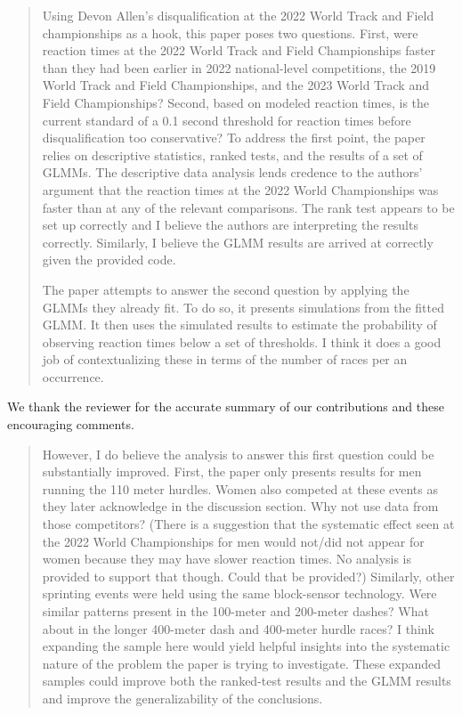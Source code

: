 \documentclass[12pt]{article}
\newenvironment{comment}%
{\begin{quotation}\noindent\small\it\color{darkblue}\ignorespaces%
}{\end{quotation}}
\begin{document}
\begin{comment}
Using Devon Allen's disqualification at the 2022 World Track and Field
championships as a hook, this paper poses two questions. First, were reaction
times at the 2022 World Track and Field Championships faster than they had been
earlier in 2022 national-level competitions, the 2019 World Track and Field
Championships, and the 2023 World Track and Field Championships? Second, based
on modeled reaction times, is the current standard of a 0.1 second threshold
for reaction times before disqualification too conservative? To
address the first point, the paper relies on descriptive statistics, ranked
tests, and the results of a set of GLMMs. The descriptive data analysis lends
credence to the authors' argument that the reaction times at the 2022 World
Championships was faster than at any of the relevant comparisons. The rank test
appears to be set up correctly and I believe the authors are interpreting the
results correctly. Similarly, I believe the GLMM results are arrived at
correctly given the provided code.

The paper attempts to answer the second question by applying the GLMMs they
already fit. To do so, it presents simulations from the fitted GLMM. It then
uses the simulated results to estimate the probability of observing reaction
times below a set of thresholds. I think it does a good job of contextualizing
these in terms of the number of races per an occurrence.
\end{comment}

We thank the reviewer for the accurate summary of our contributions
and these encouraging comments.  


\begin{comment}
However, I do believe the analysis to answer this first question could be
substantially improved. First, the paper only presents results for men running
the 110 meter hurdles. Women also competed at these events as they later
acknowledge in the discussion section. Why not use data from those competitors?
(There is a suggestion that the systematic effect seen at the 2022 World
Championships for men would not/did not appear for women because they may have
slower reaction times. No analysis is provided to support that though. Could
that be provided?) Similarly, other sprinting events were held using the same
block-sensor technology. Were similar patterns present in the 100-meter and
200-meter dashes? What about in the longer 400-meter dash and 400-meter hurdle
races? I think expanding the sample here would yield helpful insights into the
systematic nature of the problem the paper is trying to investigate. These
expanded samples could improve both the ranked-test results and the GLMM results
and improve the generalizability of the conclusions.
\end{comment}
\end{document}
